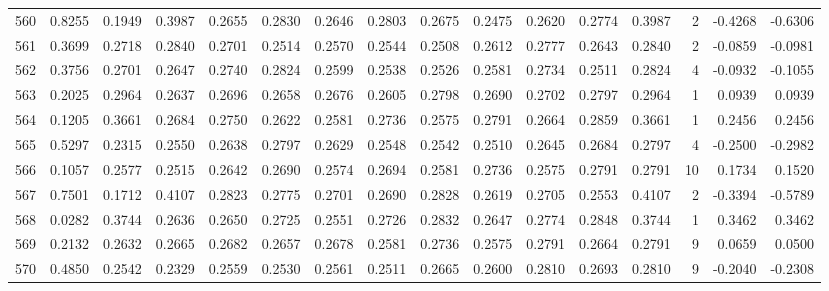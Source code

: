 \begin{tabular}{lrrrrrrrrrrrrrrr}
560 &      0.8255 &  0.1949 &  0.3987 &  0.2655 &  0.2830 &  0.2646 &  0.2803 &  0.2675 &  0.2475 &  0.2620 &   0.2774 &     0.3987 &      2 &                   -0.4268 &                    -0.6306 \\
561 &      0.3699 &  0.2718 &  0.2840 &  0.2701 &  0.2514 &  0.2570 &  0.2544 &  0.2508 &  0.2612 &  0.2777 &   0.2643 &     0.2840 &      2 &                   -0.0859 &                    -0.0981 \\
562 &      0.3756 &  0.2701 &  0.2647 &  0.2740 &  0.2824 &  0.2599 &  0.2538 &  0.2526 &  0.2581 &  0.2734 &   0.2511 &     0.2824 &      4 &                   -0.0932 &                    -0.1055 \\
563 &      0.2025 &  0.2964 &  0.2637 &  0.2696 &  0.2658 &  0.2676 &  0.2605 &  0.2798 &  0.2690 &  0.2702 &   0.2797 &     0.2964 &      1 &                    0.0939 &                     0.0939 \\
564 &      0.1205 &  0.3661 &  0.2684 &  0.2750 &  0.2622 &  0.2581 &  0.2736 &  0.2575 &  0.2791 &  0.2664 &   0.2859 &     0.3661 &      1 &                    0.2456 &                     0.2456 \\
565 &      0.5297 &  0.2315 &  0.2550 &  0.2638 &  0.2797 &  0.2629 &  0.2548 &  0.2542 &  0.2510 &  0.2645 &   0.2684 &     0.2797 &      4 &                   -0.2500 &                    -0.2982 \\
566 &      0.1057 &  0.2577 &  0.2515 &  0.2642 &  0.2690 &  0.2574 &  0.2694 &  0.2581 &  0.2736 &  0.2575 &   0.2791 &     0.2791 &     10 &                    0.1734 &                     0.1520 \\
567 &      0.7501 &  0.1712 &  0.4107 &  0.2823 &  0.2775 &  0.2701 &  0.2690 &  0.2828 &  0.2619 &  0.2705 &   0.2553 &     0.4107 &      2 &                   -0.3394 &                    -0.5789 \\
568 &      0.0282 &  0.3744 &  0.2636 &  0.2650 &  0.2725 &  0.2551 &  0.2726 &  0.2832 &  0.2647 &  0.2774 &   0.2848 &     0.3744 &      1 &                    0.3462 &                     0.3462 \\
569 &      0.2132 &  0.2632 &  0.2665 &  0.2682 &  0.2657 &  0.2678 &  0.2581 &  0.2736 &  0.2575 &  0.2791 &   0.2664 &     0.2791 &      9 &                    0.0659 &                     0.0500 \\
570 &      0.4850 &  0.2542 &  0.2329 &  0.2559 &  0.2530 &  0.2561 &  0.2511 &  0.2665 &  0.2600 &  0.2810 &   0.2693 &     0.2810 &      9 &                   -0.2040 &                    -0.2308 \\

\end{tabular}
